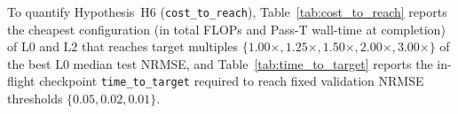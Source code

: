 To quantify Hypothesis~H6 (\texttt{cost\_to\_reach}), Table~\ref{tab:cost_to_reach} reports the cheapest configuration (in total FLOPs and Pass-T wall-time at completion) of $\mathrm{L0}$ and $\mathrm{L2}$ that reaches target multiples $\{1.00\times, 1.25\times, 1.50\times, 2.00\times, 3.00\times\}$ of the best $\mathrm{L0}$ median test NRMSE, and Table~\ref{tab:time_to_target} reports the in-flight checkpoint \texttt{time\_to\_target} required to reach fixed validation NRMSE thresholds $\{0.05, 0.02, 0.01\}$.

\begin{table}[!htbp]
\centering
\caption{Hypothesis~H6 (\texttt{cost\_to\_reach}): cheapest completed configuration of $\mathrm{L0}$ and $\mathrm{L2}$ achieving target multiples of the best $\mathrm{L0}$ median test NRMSE ($5.86\cdot 10^{-3}$ in Case~B; $7.83\cdot 10^{-3}$ in Case~C), comparing total training operations $\FLOPs_{\mathrm{total}}$, exclusive-node Pass-T time $T_{\mathrm{Pass\,T}}$ (16 threads), and shared-node Pass-A time $T_{\mathrm{Pass\,A}}$.}
\label{tab:cost_to_reach}
\footnotesize\resizebox{\textwidth}{!}{%

}
\end{table}
